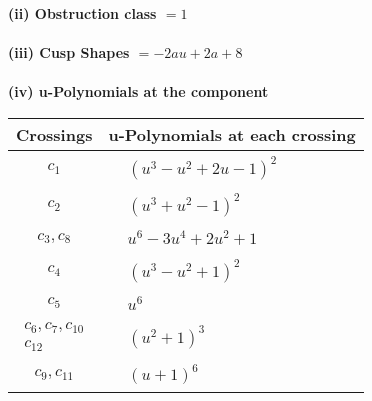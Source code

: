 \documentclass[1p]{elsarticle_modified}
\theoremstyle{definition}
\begin{document}
\flushleft \textbf{(ii) Obstruction class $= 1$}\\~\\
\flushleft \textbf{(iii) Cusp Shapes $= -2 a u+2 a+8$}\\~\\
\newpage\renewcommand{\arraystretch}{1}
\flushleft \textbf{(iv) u-Polynomials at the component}\newline \\
\begin{tabular}{m{50pt}|m{274pt}}
Crossings & \hspace{64pt}u-Polynomials at each crossing \\
\hline $$\begin{aligned}c_{1}\end{aligned}$$&$\begin{aligned}
&(u^3- u^2+2 u-1)^2
\end{aligned}$\\
\hline $$\begin{aligned}c_{2}\end{aligned}$$&$\begin{aligned}
&(u^3+u^2-1)^2
\end{aligned}$\\
\hline $$\begin{aligned}c_{3},c_{8}\end{aligned}$$&$\begin{aligned}
&u^6-3 u^4+2 u^2+1
\end{aligned}$\\
\hline $$\begin{aligned}c_{4}\end{aligned}$$&$\begin{aligned}
&(u^3- u^2+1)^2
\end{aligned}$\\
\hline $$\begin{aligned}c_{5}\end{aligned}$$&$\begin{aligned}
&u^6
\end{aligned}$\\
\hline $$\begin{aligned}c_{6},c_{7},c_{10}\\c_{12}\end{aligned}$$&$\begin{aligned}
&(u^2+1)^3
\end{aligned}$\\
\hline $$\begin{aligned}c_{9},c_{11}\end{aligned}$$&$\begin{aligned}
&(u+1)^6
\end{aligned}$\\
\hline
\end{tabular}\\~\\
\end{document}
